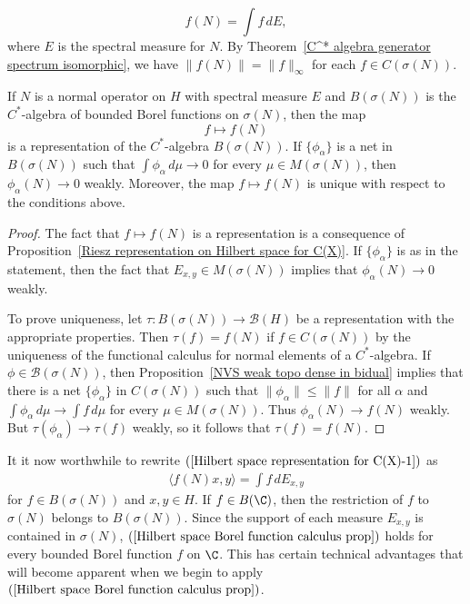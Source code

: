 \[f(N)=\int f\,dE,\]
where $E$ is the spectral measure for $N$. By Theorem~\ref{C^* algebra generator spectrum isomorphic}, we have $\|f(N)\|=\|f\|_\infty$ for each $f\in C(\sigma(N))$.
\begin{proposition}\label{Hilbert space Borel function calculus unique}
If $N$ is a normal operator on $H$ with spectral measure $E$ and $B(\sigma(N))$ is the $C^*$-algebra of bounded Borel functions on $\sigma(N)$, then the map
\[f\mapsto f(N)\]
is a representation of the $C^*$-algebra $B(\sigma(N))$. If $\{\phi_\alpha\}$ is a net in $B(\sigma(N))$ such that $\int\phi_\alpha\,d\mu\to 0$ for every $\mu\in M(\sigma(N))$, then $\phi_\alpha(N)\to 0$ weakly. Moreover, the map $f\mapsto f(N)$ is unique with respect to the conditions above.
\end{proposition}
\begin{proof}
The fact that $f\mapsto f(N)$ is a representation is a consequence of Proposition~\ref{Riesz representation on Hilbert space for C(X)}. If $\{\phi_\alpha\}$ is as in the statement, then the fact that $E_{x,y}\in M(\sigma(N))$ implies that $\phi_\alpha(N)\to 0$ weakly.\par
To prove uniqueness, let $\tau:B(\sigma(N))\to\mathcal{B}(H)$ be a representation with the appropriate properties. Then $\tau(f)=f(N)$ if $f\in C(\sigma(N))$ by the uniqueness of the functional calculus for normal elements of a $C^*$-algebra. If $\phi\in\mathcal{B}(\sigma(N))$, then Proposition~\ref{NVS weak topo dense in bidual} implies that there is a net $\{\phi_\alpha\}$ in $C(\sigma(N))$ such that $\|\phi_\alpha\|\leq\|f\|$ for all $\alpha$ and $\int\phi_\alpha\,d\mu\to\int f\,d\mu$ for every $\mu\in M(\sigma(N))$. Thus $\phi_\alpha(N)\to f(N)$ weakly. But $\tau(\phi_\alpha)\to\tau(f)$ weakly, so it follows that $\tau(f)=f(N)$.
\end{proof}
It it now worthwhile to rewrite $(\ref{Hilbert space representation for C(X)-1})$ as
\begin{align}\label{Hilbert space Borel function calculus prop}
\langle f(N)x,y\rangle=\int f\,dE_{x,y}
\end{align}
for $f\in B(\sigma(N))$ and $x,y\in H$. If $f\in B(\C)$, then the restriction of $f$ to $\sigma(N)$ belongs to $B(\sigma(N))$. Since the support of each measure $E_{x,y}$ is contained in $\sigma(N)$, $(\ref{Hilbert space Borel function calculus prop})$ holds for every bounded Borel function $f$ on $\C$. This has certain technical advantages that will become apparent when we begin to apply $(\ref{Hilbert space Borel function calculus prop})$.\par
